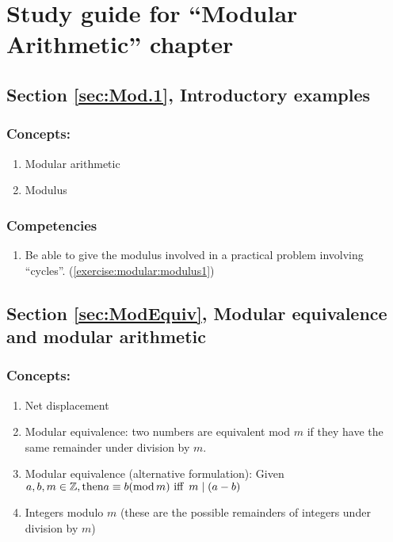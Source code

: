 \section{Study guide  for ``Modular Arithmetic''  chapter}
\label{sec:modular:study} 
\subsection*{Section \ref{sec:Mod.1}, Introductory examples}
\subsubsection*{Concepts:}
\begin{enumerate}
\item 
Modular arithmetic
\item
Modulus
\end{enumerate}

\subsubsection*{Competencies}
\begin{enumerate}
\item
Be able to give the modulus involved in a practical problem involving ``cycles''. (\ref{exercise:modular:modulus1}) 
\end{enumerate}


\subsection*{Section \ref{sec:ModEquiv}, Modular equivalence and modular arithmetic}
\subsubsection*{Concepts:}
\begin{enumerate}
\item 
Net displacement
\item 
Modular equivalence: two numbers are equivalent mod $m$ if they have the same remainder under division by $m$.
\item 
Modular equivalence (alternative formulation): Given $a, b, m \in \mathbb{Z}, \text{then}\\ a \equiv b(\text{mod}\, m) \mbox{ iff }\, m\mid(a-b)$
\item
Integers modulo $m$  (these are the possible remainders of integers under division by $m$)
\end{enumerate}

